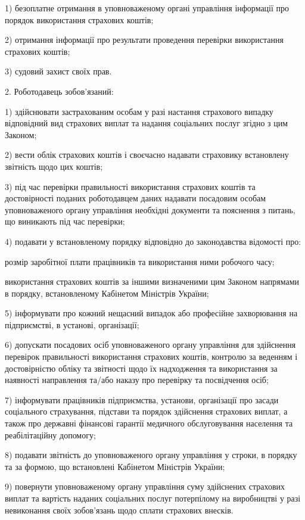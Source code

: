 1) безоплатне отримання в уповноваженому органі управління інформації про порядок використання страхових коштів;

2) отримання інформації про результати проведення перевірки використання страхових коштів;

3) судовий захист своїх прав.

2. Роботодавець зобов’язаний:

1) здійснювати застрахованим особам у разі настання страхового випадку відповідний вид страхових виплат та надання соціальних послуг згідно з цим Законом;

2) вести облік страхових коштів і своєчасно надавати страховику встановлену звітність щодо цих коштів;

3) під час перевірки правильності використання страхових коштів та достовірності поданих роботодавцем даних надавати посадовим особам уповноваженого органу управління необхідні документи та пояснення з питань, що виникають під час перевірки;

4) подавати у встановленому порядку відповідно до законодавства відомості про:

розмір заробітної плати працівників та використання ними робочого часу;

використання страхових коштів за іншими визначеними цим Законом напрямами в порядку, встановленому Кабінетом Міністрів України;

5) інформувати про кожний нещасний випадок або професійне захворювання на підприємстві, в установі, організації;

6) допускати посадових осіб уповноваженого органу управління для здійснення перевірок правильності використання страхових коштів, контролю за веденням і достовірністю обліку та звітності щодо їх надходження та використання за наявності направлення та/або наказу про перевірку та посвідчення осіб;

7) інформувати працівників підприємства, установи, організації про засади соціального страхування, підстави та порядок здійснення страхових виплат, а також про державні фінансові гарантії медичного обслуговування населення та реабілітаційну допомогу;

8) подавати звітність до уповноваженого органу управління у строки, в порядку та за формою, що встановлені Кабінетом Міністрів України;

9) повернути уповноваженому органу управління суму здійснених страхових виплат та вартість наданих соціальних послуг потерпілому на виробництві у разі невиконання своїх зобов’язань щодо сплати страхових внесків.

